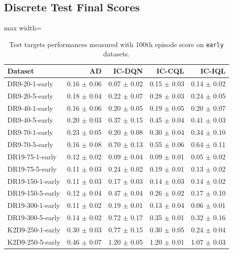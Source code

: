 \documentclass{article}
\begin{document}
\subsection{Discrete Test Final Scores}
\begin{table}[ht]
    \label{tab:}
    \begin{center}
     \caption{Test targets performances measured with 100th episode score on \texttt{early} datasets.}
    \begin{small}
    \begin{adjustbox}{max width=\columnwidth}
		\begin{tabular}{l|rrrr}
		\toprule
	\textbf{Dataset} & \textbf{AD} & \textbf{IC-DQN} & \textbf{IC-CQL} & \textbf{IC-IQL}\\
\midrule
DR9-20-1-early & 0.16 $\pm$ 0.06 & 0.07 $\pm$ 0.02 & 0.15 $\pm$ 0.03 & 0.14 $\pm$ 0.02\\
DR9-20-5-early & 0.18 $\pm$ 0.04 & 0.22 $\pm$ 0.07 & 0.28 $\pm$ 0.03 & 0.24 $\pm$ 0.05\\
DR9-40-1-early & 0.16 $\pm$ 0.06 & 0.20 $\pm$ 0.05 & 0.19 $\pm$ 0.05 & 0.20 $\pm$ 0.07\\
DR9-40-5-early & 0.20 $\pm$ 0.03 & 0.37 $\pm$ 0.15 & 0.45 $\pm$ 0.04 & 0.41 $\pm$ 0.03\\
DR9-70-1-early & 0.23 $\pm$ 0.05 & 0.20 $\pm$ 0.08 & 0.30 $\pm$ 0.04 & 0.34 $\pm$ 0.10\\
DR9-70-5-early & 0.16 $\pm$ 0.08 & 0.70 $\pm$ 0.13 & 0.55 $\pm$ 0.06 & 0.64 $\pm$ 0.11\\
DR19-75-1-early & 0.12 $\pm$ 0.02 & 0.09 $\pm$ 0.04 & 0.09 $\pm$ 0.01 & 0.05 $\pm$ 0.02\\
DR19-75-5-early & 0.11 $\pm$ 0.03 & 0.24 $\pm$ 0.02 & 0.19 $\pm$ 0.01 & 0.13 $\pm$ 0.02\\
DR19-150-1-early & 0.11 $\pm$ 0.03 & 0.17 $\pm$ 0.03 & 0.14 $\pm$ 0.03 & 0.14 $\pm$ 0.02\\
DR19-150-5-early & 0.12 $\pm$ 0.04 & 0.47 $\pm$ 0.04 & 0.26 $\pm$ 0.02 & 0.17 $\pm$ 0.10\\
DR19-300-1-early & 0.11 $\pm$ 0.02 & 0.19 $\pm$ 0.01 & 0.13 $\pm$ 0.04 & 0.06 $\pm$ 0.01\\
DR19-300-5-early & 0.14 $\pm$ 0.02 & 0.72 $\pm$ 0.17 & 0.35 $\pm$ 0.01 & 0.32 $\pm$ 0.16\\
K2D9-250-1-early & 0.30 $\pm$ 0.03 & 0.77 $\pm$ 0.15 & 0.30 $\pm$ 0.05 & 0.24 $\pm$ 0.04\\
K2D9-250-5-early & 0.46 $\pm$ 0.07 & 1.20 $\pm$ 0.05 & 1.20 $\pm$ 0.01 & 1.07 $\pm$ 0.03\\

\end{tabular}
\end{adjustbox}
\end{small}
\end{center}
\end{table}
\end{document}
